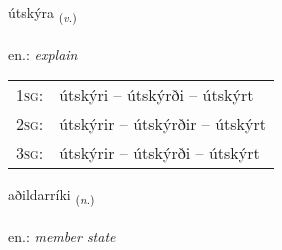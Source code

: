 \documentclass[frontgrid, backgrid]{flacards}\usepackage[]{graphicx}\usepackage[]{xcolor}
\begin{document}
\renewcommand{\flhead}{\vskip5pt \fboxsep=0pt {\small\bfseries\footnotesize Sagnorð | Verb}}
\renewcommand{\fcfoot}{\vskip5pt \fboxsep=0pt \hspace{2pt}{\small\bfseries\footnotesize 2K}}

\renewcommand{\blhead}{\vskip5pt {\small\bfseries\footnotesize Sagnorð | Verb }}
\renewcommand{\bcfoot}{\vskip5pt \hspace{2pt}{\small\bfseries\footnotesize 2K}}


{útskýra \small{\textsubscript{(\textit{v.})}} \\[1ex] %
\textphonetic{[uːtscira]} \\
en.: \emph{explain} \\  [2ex]
\renewcommand*{\arraystretch}{0.8}
\begin{tabular}{p{1cm}l}
\textsc{1sg}: & útskýri -- útskýrði -- útskýrt \\ 
\textsc{2sg}: & útskýrir -- útskýrðir -- útskýrt \\ 
\textsc{3sg}: & útskýrir -- útskýrði -- útskýrt \\ 
\end{tabular}
}

\renewcommand{\flhead}{\vskip5pt \fboxsep=0pt {\small\bfseries\footnotesize Nafnorð | Noun}}
\renewcommand{\fcfoot}{\vskip5pt \fboxsep=0pt \hspace{2pt}{\small\bfseries\footnotesize 2K}}

\renewcommand{\blhead}{\vskip5pt {\small\bfseries\footnotesize Nafnorð | Noun }}
\renewcommand{\bcfoot}{\vskip5pt \hspace{2pt}{\small\bfseries\footnotesize 2K}}


{aðildarríki \small{\textsubscript{(\textit{n.})}} \\[1ex] %
\textphonetic{[aːðɪltaricɪ]} \\
en.: \emph{member state} \\  [2ex]
\renewcommand*{\arraystretch}{0.8}
}
\end{document}
